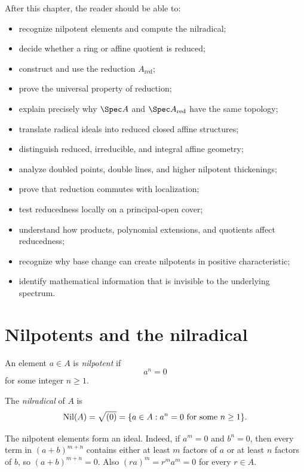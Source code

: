 After this chapter, the reader should be able to:
\begin{itemize}
\item recognize nilpotent elements and compute the nilradical;
\item decide whether a ring or affine quotient is reduced;
\item construct and use the reduction $A_{\mathrm{red}}$;
\item prove the universal property of reduction;
\item explain precisely why $\Spec A$ and $\Spec A_{\mathrm{red}}$ have the same topology;
\item translate radical ideals into reduced closed affine structures;
\item distinguish reduced, irreducible, and integral affine geometry;
\item analyze doubled points, double lines, and higher nilpotent thickenings;
\item prove that reduction commutes with localization;
\item test reducedness locally on a principal-open cover;
\item understand how products, polynomial extensions, and quotients affect reducedness;
\item recognize why base change can create nilpotents in positive characteristic;
\item identify mathematical information that is invisible to the underlying spectrum.
\end{itemize}

\section{Nilpotents and the nilradical}

\begin{definition}
An element $a\in A$ is \emph{nilpotent} if
\[
a^n=0
\]
for some integer $n\ge 1$.
\end{definition}

\begin{definition}[Nilradical]
The \emph{nilradical} of $A$ is
\[
\operatorname{Nil}(A)=\sqrt{(0)}=\{a\in A:a^n=0\text{ for some }n\ge1\}.
\]
\end{definition}

The nilpotent elements form an ideal.  Indeed, if $a^m=0$ and $b^n=0$, then every term in
$(a+b)^{m+n}$ contains either at least $m$ factors of $a$ or at least $n$ factors of $b$,
so $(a+b)^{m+n}=0$.  Also $(ra)^m=r^m a^m=0$ for every $r\in A$.

